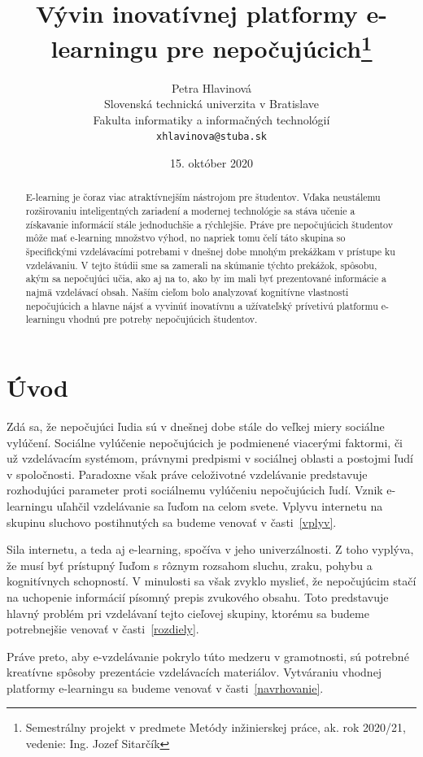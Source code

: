 \documentclass[10pt,oneside,slovak,a4paper]{article}
\title{Vývin inovatívnej platformy e-learningu pre nepočujúcich\thanks{Semestrálny projekt v predmete Metódy inžinierskej práce, ak. rok 2020/21, vedenie: Ing. Jozef Sitarčík}} %
\author{Petra Hlavinová\\[2pt]
	{\small Slovenská technická univerzita v Bratislave}\\
	{\small Fakulta informatiky a informačných technológií}\\
	{\small \texttt{xhlavinova@stuba.sk}}
	}
\date{\small 15. október 2020} %
\begin{document}
\maketitle

\begin{abstract}
E-learning je čoraz viac atraktívnejším nástrojom pre študentov. Vďaka neustálemu rozširovaniu inteligentných zariadení a modernej technológie sa stáva učenie a získavanie informácií stále jednoduchšie a rýchlejšie. Práve pre nepočujúcich študentov môže mať e-learning množstvo výhod, no napriek tomu čelí táto skupina so špecifickými vzdelávacími potrebami v dnešnej dobe mnohým prekážkam v prístupe ku vzdelávaniu. V tejto štúdii sme sa zamerali na skúmanie týchto prekážok, spôsobu, akým sa nepočujúci učia, ako aj na to, ako by im mali byť prezentované informácie a najmä vzdelávací obsah. Naším cieľom bolo analyzovať kognitívne vlastnosti nepočujúcich a hlavne nájsť a vyvinúť inovatívnu a užívateľský prívetivú platformu e-learningu vhodnú pre potreby nepočujúcich študentov. 
\end{abstract}

\section{Úvod}

Zdá sa, že nepočujúci ľudia sú v dnešnej dobe stále do veľkej miery sociálne vylúčení. Sociálne vylúčenie nepočujúcich je podmienené viacerými faktormi, či už vzdelávacím systémom, právnymi predpismi v sociálnej oblasti a postojmi ľudí v spoločnosti. Paradoxne však práve celoživotné vzdelávanie predstavuje rozhodujúci parameter proti sociálnemu vylúčeniu nepočujúcich ľudí. Vznik e-learningu uľahčil vzdelávanie sa ľuďom na celom svete. Vplyvu internetu na skupinu sluchovo postihnutých sa budeme venovať v časti~\ref{vplyv}.

Sila internetu, a teda aj e-learning, spočíva v jeho univerzálnosti. Z toho vyplýva, že musí byť prístupný ľuďom s rôznym rozsahom sluchu, zraku, pohybu a kognitívnych schopností. V minulosti sa však zvyklo myslieť, že nepočujúcim stačí na uchopenie informácií písomný prepis zvukového obsahu. Toto predstavuje hlavný problém pri vzdelávaní tejto cieľovej skupiny, ktorému sa budeme potrebnejšie venovať v časti~\ref{rozdiely}.
 
Práve preto, aby e-vzdelávanie pokrylo túto medzeru v gramotnosti, sú potrebné kreatívne spôsoby prezentácie vzdelávacích materiálov. Vytváraniu vhodnej platformy e-learningu sa budeme venovať v časti~\ref{navrhovanie}.
\end{document}
